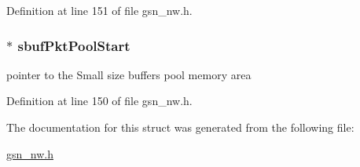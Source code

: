 Definition at line 151 of file gsn\_\-nw.h.

\hypertarget{a00165_a48ee92559c5235d053bb798c92e469eb}{
\subsubsection[{sbufPktPoolStart}]{$\ast$ {\bf sbufPktPoolStart}}}
\label{a00165_a48ee92559c5235d053bb798c92e469eb}
pointer to the Small size buffers pool memory area 

Definition at line 150 of file gsn\_\-nw.h.



The documentation for this struct was generated from the following file:\begin{DoxyCompactItemize}
\item 
\hyperlink{a00532}{gsn\_\-nw.h}\end{DoxyCompactItemize}
